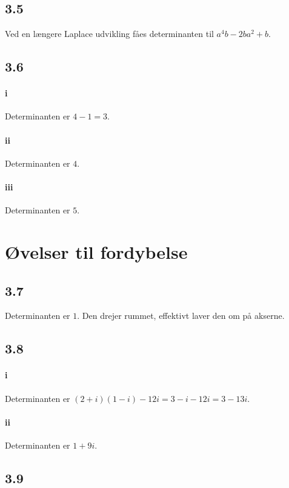 		\subsection{3.5}

			Ved en længere Laplace udvikling fåes determinanten til $a^4b-2ba^2+b$.

		\subsection{3.6}

			\paragraph{i} Determinanten er $4-1=3$.

			\paragraph{ii} Determinanten er $4$.   

			\paragraph{iii} Determinanten er $5$.   

	\section{Øvelser til fordybelse}

		\subsection{3.7}

			Determinanten er $1$. Den drejer rummet, effektivt laver den om på akserne.

		\subsection{3.8}

			\paragraph{i} Determinanten er $(2+i)(1-i)-12i=3-i-12i=3-13i$.

			\paragraph{ii} Determinanten er $1+9i$.

		\subsection{3.9}


